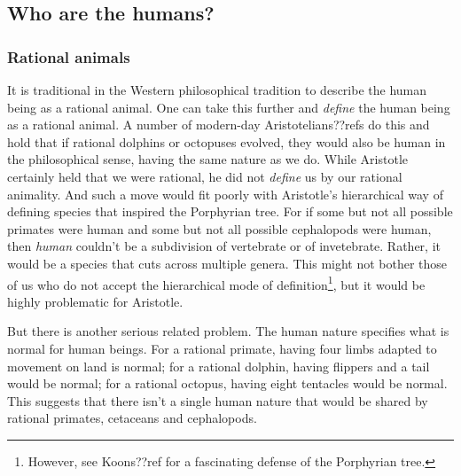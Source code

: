 \subsection{Who are the humans?}
\subsubsection{Rational animals}
It is traditional in the Western philosophical tradition to describe the human being as a rational animal. One can
take this further and \textit{define} the human being as a rational animal. A number of modern-day Aristotelians??refs do this
and hold that if rational dolphins or octopuses evolved, they would also be human in the philosophical sense, having the 
same nature as we do. While Aristotle certainly held that we were rational, he did not \textit{define} us by our rational animality.
And such a move would fit poorly with Aristotle's hierarchical
way of defining species that inspired the Porphyrian tree. For if some but not all possible primates were human and some 
but not all possible cephalopods were human, then \textit{human} couldn't be a subdivision of vertebrate or of invetebrate. Rather, 
it would be a species that cuts across multiple genera. This might not bother those of us who do not accept the hierarchical
mode of definition\footnote{However, see Koons??ref for a fascinating defense of the Porphyrian tree.}, but it would be 
highly problematic for Aristotle. 

But there is another serious related problem. The human nature specifies what is normal for human beings. For a rational
primate, having four limbs adapted to movement on land is normal; for a rational dolphin, having flippers and a tail would be 
normal; for a rational octopus, having eight tentacles would be normal. This suggests that there isn't a single human nature
that would be shared by rational primates, cetaceans and cephalopods. 

